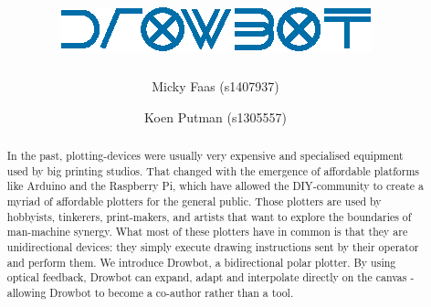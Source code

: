 \documentclass[a4paper,10pt]{article}
\title{\vspace{-5.5em}
\includegraphics[scale=1]{img/logo.eps} \\ \vspace{.5em}
\Large \sffamily{A Suspended Polar Plotting Robot}}
\author{Micky Faas (s1407937) \and Koen Putman (s1305557)}
\date{}
\begin{document}
\maketitle
\begin{abstract}
In the past, plotting-devices were usually very expensive and specialised
equipment used by big printing studios.
That changed with the emergence of affordable platforms like Arduino and the
Raspberry Pi, which have allowed the DIY-community to create a myriad of
affordable plotters for the general public.
Those plotters are used by hobbyists, tinkerers, print-makers, and artists that
want to explore the boundaries of man-machine synergy.
What most of these plotters have in common is that they are unidirectional
devices: they simply execute drawing instructions sent by their operator
and perform them.
We introduce Drowbot, a bidirectional polar plotter.
By using optical feedback, Drowbot can expand, adapt and interpolate
directly on the canvas - allowing Drowbot to become a co-author rather than a tool.

\end{abstract}
\end{document}
